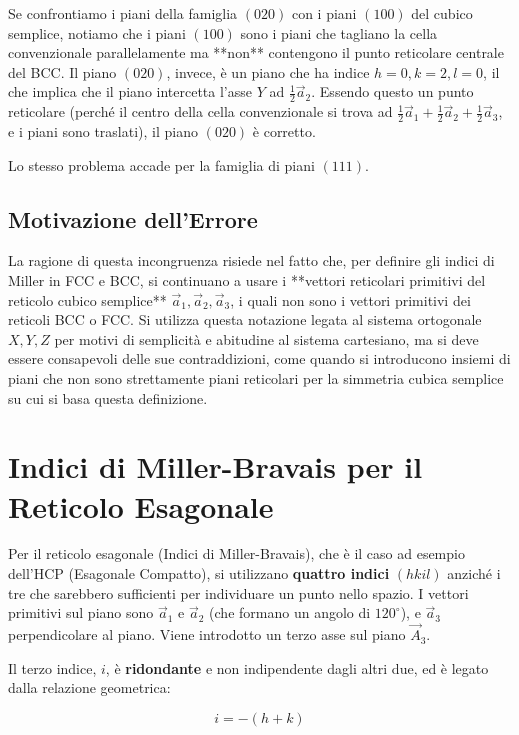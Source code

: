 Se confrontiamo i piani della famiglia $(020)$ con i piani $(100)$ del cubico semplice, notiamo che i piani $(100)$ sono i piani che tagliano la cella convenzionale parallelamente ma **non** contengono il punto reticolare centrale del BCC. Il piano $(020)$, invece, è un piano che ha indice $h=0, k=2, l=0$, il che implica che il piano intercetta l'asse $Y$ ad $\frac{1}{2} \vec{a}_2$. Essendo questo un punto reticolare (perché il centro della cella convenzionale si trova ad $\frac{1}{2}\vec{a}_1 + \frac{1}{2}\vec{a}_2 + \frac{1}{2}\vec{a}_3$, e i piani sono traslati), il piano $(020)$ è corretto.

Lo stesso problema accade per la famiglia di piani $(111)$.

\subsection{Motivazione dell'Errore}
La ragione di questa incongruenza risiede nel fatto che, per definire gli indici di Miller in FCC e BCC, si continuano a usare i **vettori reticolari primitivi del reticolo cubico semplice** $\vec{a}_1, \vec{a}_2, \vec{a}_3$, i quali non sono i vettori primitivi dei reticoli BCC o FCC. Si utilizza questa notazione legata al sistema ortogonale $X, Y, Z$ per motivi di semplicità e abitudine al sistema cartesiano, ma si deve essere consapevoli delle sue contraddizioni, come quando si introducono insiemi di piani che non sono strettamente piani reticolari per la simmetria cubica semplice su cui si basa questa definizione.

\section{Indici di Miller-Bravais per il Reticolo Esagonale}

Per il reticolo esagonale (Indici di Miller-Bravais), che è il caso ad esempio dell'HCP (Esagonale Compatto), si utilizzano \textbf{quattro indici} $(h k i l)$ anziché i tre che sarebbero sufficienti per individuare un punto nello spazio. I vettori primitivi sul piano sono $\vec{a}_1$ e $\vec{a}_2$ (che formano un angolo di $120^{\circ}$), e $\vec{a}_3$ perpendicolare al piano. Viene introdotto un terzo asse sul piano $\vec{A}_3$.

Il terzo indice, $i$, è \textbf{ridondante} e non indipendente dagli altri due, ed è legato dalla relazione geometrica:

\vspace{1em}
\begin{equation}
i = -(h+k)
\end{equation}
\vspace{1em}

